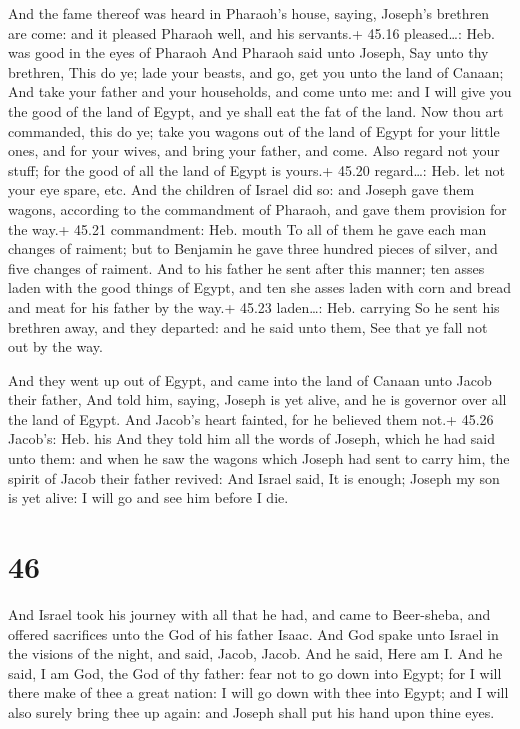  And the fame thereof was heard in Pharaoh's house,
saying, Joseph's brethren are come: and it pleased Pharaoh well, and his
servants.+ 45.16 pleased\ldots: Heb. was good in the eyes of Pharaoh
 And Pharaoh said unto Joseph, Say unto thy brethren, This
do ye; lade your beasts, and go, get you unto the land of Canaan;
 And take your father and your households, and come unto
me: and I will give you the good of the land of Egypt, and ye shall eat
the fat of the land.  Now thou art commanded, this do ye;
take you wagons out of the land of Egypt for your little ones, and for
your wives, and bring your father, and come.  Also regard
not your stuff; for the good of all the land of Egypt is yours.+ 45.20
regard\ldots: Heb. let not your eye spare, etc.  And the
children of Israel did so: and Joseph gave them wagons, according to the
commandment of Pharaoh, and gave them provision for the way.+ 45.21
commandment: Heb. mouth  To all of them he gave each man
changes of raiment; but to Benjamin he gave three hundred pieces of
silver, and five changes of raiment.  And to his father he
sent after this manner; ten asses laden with the good things of Egypt,
and ten she asses laden with corn and bread and meat for his father by
the way.+ 45.23 laden\ldots: Heb. carrying  So he sent his
brethren away, and they departed: and he said unto them, See that ye
fall not out by the way.

 And they went up out of Egypt, and came into the land of
Canaan unto Jacob their father,  And told him, saying,
Joseph is yet alive, and he is governor over all the land of Egypt. And
Jacob's heart fainted, for he believed them not.+ 45.26 Jacob's: Heb.
his  And they told him all the words of Joseph, which he
had said unto them: and when he saw the wagons which Joseph had sent to
carry him, the spirit of Jacob their father revived:  And
Israel said, It is enough; Joseph my son is yet alive: I will go and see
him before I die.

\hypertarget{section-45}{%
\section{46}\label{section-45}}

 And Israel took his journey with all that he had, and came
to Beer-sheba, and offered sacrifices unto the God of his father Isaac.
 And God spake unto Israel in the visions of the night, and
said, Jacob, Jacob. And he said, Here am I.  And he said, I
am God, the God of thy father: fear not to go down into Egypt; for I
will there make of thee a great nation:  I will go down with
thee into Egypt; and I will also surely bring thee up again: and Joseph
shall put his hand upon thine eyes.

